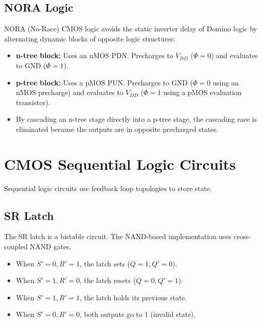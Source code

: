 \documentclass[12pt,a4paper]{article}
\begin{document}
\subsection{NORA Logic}
NORA (No-Race) CMOS logic avoids the static inverter delay of Domino logic by alternating dynamic blocks of opposite logic structures:
\begin{itemize}[leftmargin=*, itemsep=3.5pt]
  \item \textbf{n-tree block:} Uses an nMOS PDN. Precharges to $V_{DD}$ ($\Phi = 0$) and evaluates to GND ($\Phi = 1$).
  \item \textbf{p-tree block:} Uses a pMOS PUN. Precharges to GND ($\Phi = 0$ using an nMOS precharge) and evaluates to $V_{DD}$ ($\Phi = 1$ using a pMOS evaluation transistor).
  \item By cascading an n-tree stage directly into a p-tree stage, the cascading race is eliminated because the outputs are in opposite precharged states.
\end{itemize}

\section{CMOS Sequential Logic Circuits}

Sequential logic circuits use feedback loop topologies to store state.

\subsection{SR Latch}
The SR latch is a bistable circuit. The NAND-based implementation uses cross-coupled NAND gates.
\begin{itemize}[leftmargin=*, itemsep=3pt]
  \item When $S' = 0, R' = 1$, the latch sets ($Q=1, Q'=0$).
  \item When $S' = 1, R' = 0$, the latch resets ($Q=0, Q'=1$).
  \item When $S' = 1, R' = 1$, the latch holds its previous state.
  \item When $S' = 0, R' = 0$, both outputs go to 1 (invalid state).
\end{itemize}
\end{document}
